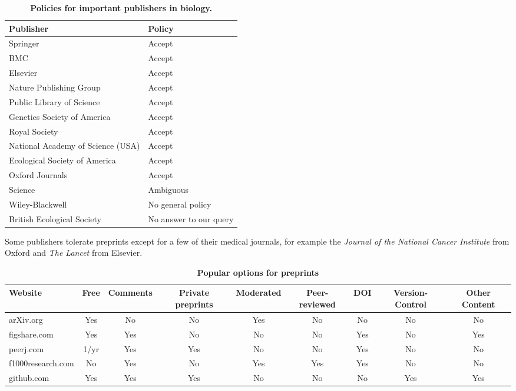 \documentclass[10pt]{article}
\begin{document}
\begin{table}[!ht]
    \caption{\bf{Policies for important publishers in biology.}}
    \begin{tabular}{|ll|}
    \hline
    Publisher                                   & Policy \\
    \hline
    Springer                            	& Accept \\
    BMC                                 	& Accept \\
    Elsevier                            	& Accept \\
    Nature Publishing Group             	& Accept \\
    Public Library of Science           	& Accept \\
    Genetics Society of America                 & Accept \\
    Royal Society                       	& Accept \\
    National Academy of Science (USA)           & Accept \\
    Ecological Society of America       	& Accept \\
    Oxford Journals                             & Accept \\
    Science                             	& Ambiguous \\
    Wiley-Blackwell                       	& No general policy \\
    British Ecological Society                  & No answer to our query \\
    \hline
    \end{tabular}
    \begin{flushleft} Some publishers tolerate preprints except for a few of
their medical journals, for example the \emph{ Journal of the National Cancer
Institute} from Oxford and \emph{The Lancet} from Elsevier.  \end{flushleft}
    \label{table:policies}
\end{table}

\begin{table}[!ht]
    \caption{\bf{Popular options for preprints}}
    \begin{tabular}{|l|cccccccc|}
    \hline
    Website               & Free & Comments & Private preprints & Moderated & Peer-reviewed & DOI & Version-Control & Other Content\\
    \hline
    arXiv.org             & Yes & No & No & Yes & No & No & No & No\\
    figshare.com          & Yes & Yes & No & No & No & Yes & No & Yes\\
    peerj.com             & 1/yr & Yes & Yes & No & No & Yes & No & No\\
    f1000research.com     & No & Yes & No & Yes & Yes & Yes & No & No\\
    github.com            & Yes & Yes & Yes & No & No & No & Yes & Yes\\
    \hline
    \end{tabular}
    \label{table:box1}
\end{table}
\end{document}
